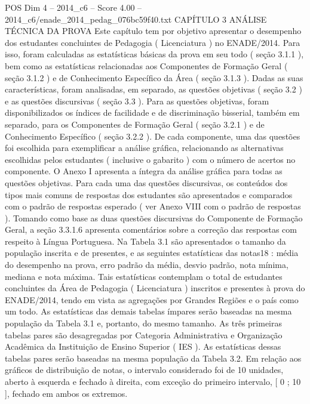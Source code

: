 \begin{textsample}{POS Dim 4 – 2014\_c6 – Score 4.00 – 2014\_c6/enade\_2014\_pedag\_076bc59f40.txt}  \label{ex:f4_pos_072}
CAPÍTULO 3 ANÁLISE TÉCNICA DA PROVA Este capítulo tem por objetivo apresentar o desempenho dos estudantes concluintes de Pedagogia ( Licenciatura ) no ENADE/2014.
Para isso, foram calculadas as estatísticas básicas da prova em seu todo ( seção 3.1.1 ), bem como as estatísticas relacionadas aos Componentes de Formação Geral ( seção 3.1.2 ) e de Conhecimento Específico da Área ( seção 3.1.3 ).
Dadas as suas características, foram analisadas, em separado, as questões objetivas ( seção 3.2 ) e as questões discursivas ( seção 3.3 ).
Para as questões objetivas, foram disponibilizados os índices de facilidade e de discriminação bisserial, também em separado, para os Componentes de Formação Geral ( seção 3.2.1 ) e de Conhecimento Específico ( seção 3.2.2 ).
De cada componente, uma das questões foi escolhida para exemplificar a análise gráfica, relacionando as alternativas escolhidas pelos estudantes ( inclusive o gabarito ) com o número de acertos no componente.
O Anexo I apresenta a íntegra da análise gráfica para todas as questões objetivas.
Para cada uma das questões discursivas, os conteúdos dos tipos mais comuns de respostas dos estudantes são apresentados e comparados com o padrão de respostas esperado ( ver Anexo VIII com o padrão de respostas ).
Tomando como base as duas questões discursivas do Componente de Formação Geral, a seção 3.3.1.6 apresenta comentários sobre a correção das respostas com respeito à Língua Portuguesa.
Na Tabela 3.1 são apresentados o tamanho da população inscrita e de presentes, e as seguintes estatísticas das notas18 : média do desempenho na prova, erro padrão da média, desvio padrão, nota mínima, mediana e nota máxima.
Tais estatísticas contemplam o total de estudantes concluintes da Área de Pedagogia ( Licenciatura ) inscritos e presentes à prova do ENADE/2014, tendo em vista as agregações por Grandes Regiões e o país como um todo.
As estatísticas das demais tabelas ímpares serão baseadas na mesma população da Tabela 3.1 e, portanto, do mesmo tamanho.
As três primeiras tabelas pares são desagregadas por Categoria Administrativa e Organização Acadêmica da Instituição de Ensino Superior ( IES ).
As estatísticas dessas tabelas pares serão baseadas na mesma população da Tabela 3.2.
Em relação aos gráficos de distribuição de notas, o intervalo considerado foi de 10 unidades, aberto à esquerda e fechado à direita, com exceção do primeiro intervalo, [ 0 ; 10 ], fechado em ambos os extremos.

\end{textsample}
